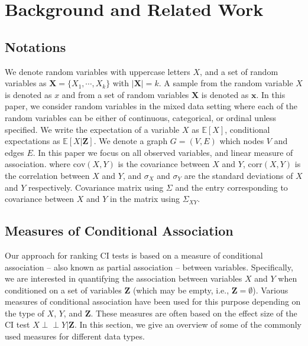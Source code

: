 \documentclass{uai2025} %
\def\ci{\perp\!\!\!\!\!\perp}
\begin{document}

\section{Background and Related Work}
\label{sec:background}
\subsection{Notations} 
We denote random variables with uppercase letters $ X $, and a set of random
variables as $ \bm{X} = \{X_1, \cdots, X_k\} $ with $ \rvert \bm{X} \rvert = k
$. A sample from the random variable $ X $ is denoted as $ x $ and from a set
of random variables $ \bm{X} $ is denoted as $ \bm{x} $. In this paper, we
consider random variables in the mixed data setting where each of the random
variables can be either of continuous, categorical, or ordinal unless
specified. We write the expectation of a variable $ X $ as $ \mathbb{E}[X] $,
conditional expectations as $ \mathbb{E}[X | \bm{Z}] $. We denote a graph $ G =
(V, E) $ which nodes $ V$ and edges $ E $. In this paper we focus on all
observed variables, and linear measure of association. 
where $ \mathrm{cov}(X, Y) $ is the covariance between $ X $ and $ Y $, $ \mathrm{corr}(X, Y) $ is the correlation between $ X $ and $ Y $, and $
\sigma_X $ and $ \sigma_Y $ are the standard deviations of $ X $ and $ Y $
respectively.  Covariance matrix using $ \Sigma $ and the entry corresponding to
covariance between $ X $ and $ Y $ in the matrix using $ \Sigma_{XY} $.

\subsection{Measures of Conditional Association}
Our approach for ranking CI tests is based on a measure of conditional
association -- also known as partial association -- between variables.
Specifically, we are interested in quantifying the association between
variables $ X $ and $ Y $ when conditioned on a set of variables $ \bm{Z} $
(which may be empty, i.e., $ \bm{Z} = \emptyset $). Various measures of
conditional association have been used for this purpose depending on the type
of $ X $, $ Y $, and $ \bm{Z} $. These measures are often based on the effect
size of the CI test $ X \ci Y \rvert \bm{Z} $. In this section, we give an
overview of some of the commonly used measures for different data types.
\end{document}
